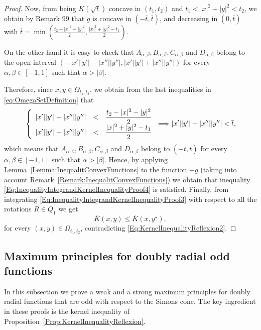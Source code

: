 \begin{proof}
Now, from being $K(\sqrt{t})$ concave in $(t_1,t_2)$ and $t_1<|x|^2+|y|^2<t_2$, we obtain by Remark
99 that $g$ is concave in $ \left( -\overline{t}, \overline{t}\right) $, and decreasing in
$(0,\overline{t})$ with $\overline{t} =
\min{\left(\frac{t_2-|x|^2-|y|^2}{2},\frac{|x|^2+|y|^2-t_1}{2}\right)}$.

On the other hand it is easy to check that $A_{\alpha,\beta}, B_{\alpha,\beta}, C_{\alpha,\beta}$
and $D_{\alpha,\beta}$ belong to the open interval $(-|x'||y'|-|x''||y''|,|x'||y'|+|x''||y''|)$ for
every $\alpha, \beta \in [-1,1]$ such that $\alpha>|\beta|$.

Therefore, since $x,y \in \Omega_{t_1,t_2}$, we obtain from the last inequalities in
\eqref{eq:OmegaSetDefinition} that
$$
\left\{\begin{array}{rcll}
|x'||y'|+|x''||y''|&<&\dfrac{t_2-|x|^2-|y|^2}{2}\\
|x'||y'|+|x''||y''|&<&\dfrac{|x|^2+|y|^2-t_1}{2}
\end{array} \right. \Longrightarrow  |x'||y'|+|x''||y''|<\overline{t},
$$
which means that $A_{\alpha,\beta}, B_{\alpha,\beta}, C_{\alpha,\beta}$ and $D_{\alpha,\beta}$
belong to $(-\overline{t},\overline{t})$ for every $\alpha, \beta \in [-1,1]$ such that
$\alpha>|\beta|$. Hence, by applying Lemma~\ref{Lemma:InequalitConvexFunctions} to the function
$-g$ (taking into account Remark~\ref{Remark:InequalitConvexFunctions}) we obtain that inequality
\eqref{Eq:InequalityIntegrandKernelInequalityProof4} is satisfied. Finally, from integrating
\eqref{Eq:InequalityIntegrandKernelInequalityProof3} with respect to all the rotations $R\in Q_1$
we get
$$ \overline{K}(x,y) \leq \overline{K}(x, y^\star),$$
for every $(x,y)\in \Omega_{t_1,t_2}$, contradicting \eqref{Eq:KernelInequalityReflexion2}.
\end{proof}

\subsection{Maximum principles for doubly radial odd functions}

In this subsection we prove a weak and a strong maximum principles for doubly radial functions that
are odd with respect to the Simons cone. The key ingredient in these proofs is the kernel
inequality of Proposition~\ref{Prop:KernelInequalityReflexion}.

